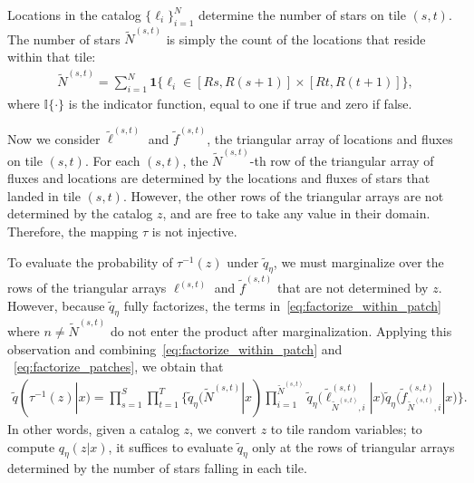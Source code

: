 Locations in the catalog $\{\ell_i\}_{i=1}^N$
determine the number of stars on tile $(s,t)$. 
The number of stars $\tilde N^{(s,t)}$ is simply the count of the locations that reside within that tile:
\begin{align}
\tilde N^{(s,t)} = \sum_{i=1}^N 
\mathbf 1 \Big\{\ell_i\in [Rs, R(s+1)] \times [Rt, R(t+1)]\Big\},
\end{align}
where $\mathbb{I}\{\cdot\}$ is the indicator function, equal to one if true and zero if false.

Now we consider $\tilde\ell^{(s, t)}$ and $\tilde f^{(s, t)}$, the triangular array of locations and fluxes on tile $(s,t)$. 
For each $(s,t)$, the $\tilde N^{(s,t)}$-th row 
of the triangular array of fluxes and locations are 
determined by the locations and fluxes of stars that landed in tile $(s,t)$. However, the other rows 
of the triangular arrays are not determined by 
the catalog $z$, and are free to take any value in their domain. Therefore, the mapping $\tau$ is not injective. 

To evaluate the probability of $\tau^{-1}(z)$ under $\tilde q_\eta$, we must marginalize over the rows of the triangular arrays $\ell^{(s, t)}$ and $\tilde f^{(s, t)}$ that are not determined by $z$. However, 
because $\tilde q_\eta$ fully factorizes, the terms 
in~\eqref{eq:factorize_within_patch} where $n \not= \tilde N^{(s,t)}$ do not enter the
product
after marginalization.
Applying this observation and combining~\eqref{eq:factorize_within_patch} and ~\eqref{eq:factorize_patches}, we obtain that
\begin{align}
    \tilde q(\tau^{-1}(z) | x) = \prod_{s=1}^S\prod_{t=1}^T
    \Big\{
    \tilde q_\eta(\tilde N^{(s,t)} | x) 
    \prod_{i = 1}^{\tilde N^{(s,t)}}
    \tilde q_\eta\big(\tilde \ell_{\tilde N^{(s,t)},i}^{(s, t)} | x\big)
    \tilde q_\eta\big(\tilde f_{\tilde N^{(s,t)},i}^{(s, t)} | x\big)
    \Big\}.
\end{align}
In other words, given a catalog $z$,
we convert $z$ to tile random variables;
to compute $q_\eta(z | x)$, it suffices to evaluate $\tilde q_\eta$ only at the rows of triangular 
arrays determined by the number 
of stars falling in each tile. 


